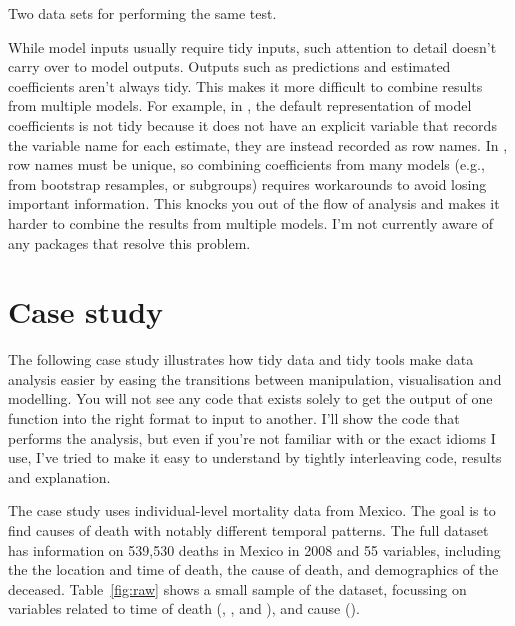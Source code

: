 \documentclass[article]{jss}
\begin{document}
\begin{table}
  \centering
  \hspace{2em}%

  \caption{Two data sets for performing the same test.}
  \label{label}
\end{table}

While model inputs usually require tidy inputs, such attention to detail doesn't carry over to model outputs. Outputs such as predictions and estimated coefficients aren't always tidy. This makes it more difficult to combine results from multiple models. For example, in , the default representation of model coefficients is not tidy because it does not have an explicit variable that records the variable name for each estimate, they are instead recorded as row names. In , row names must be unique, so combining coefficients from many models (e.g., from bootstrap resamples, or subgroups) requires workarounds to avoid losing important information. This knocks you out of the flow of analysis and makes it harder to combine the results from multiple models. I'm not currently aware of any packages that resolve this problem.

\section{Case study} 
\label{sec:case-study}

The following case study illustrates how tidy data and tidy tools make data analysis easier by easing the transitions between manipulation, visualisation and modelling. You will not see any code that exists solely to get the output of one function into the right format to input to another. I'll show the  code that performs the analysis, but even if you're not familiar with  or the exact idioms I use, I've tried to make it easy to understand by tightly interleaving code, results and explanation.

The case study uses individual-level mortality data from Mexico. The goal is to find causes of death with notably different temporal patterns. The full dataset has information on 539,530 deaths in Mexico in 2008 and 55 variables, including the the location and time of death, the cause of death, and demographics of the deceased. Table~\ref{fig:raw} shows a small sample of the dataset, focussing on variables related to time of death (, ,  and ), and cause ().
\end{document}
